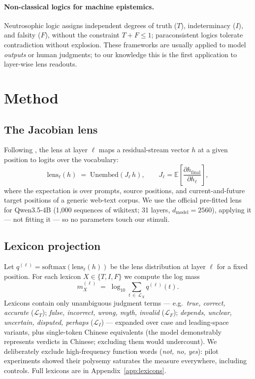 \documentclass[11pt]{article}
\begin{document}
\paragraph{Non-classical logics for machine epistemics.} Neutrosophic logic
\cite{smarandache1998neutrosophy} assigns independent degrees of truth ($T$),
indeterminacy ($I$), and falsity ($F$), without the constraint $T+F\le 1$;
paraconsistent logics \cite{priest1979paradox} tolerate contradiction without
explosion. These frameworks are usually applied to model \emph{outputs} or
human judgments; to our knowledge this is the first application to layer-wise
lens readouts.

\section{Method}\label{sec:method}

\subsection{The Jacobian lens}
Following \cite{anthropic2026workspace}, the lens at layer $\ell$ maps a
residual-stream vector $h$ at a given position to logits over the vocabulary:
\begin{equation}
\mathrm{lens}_\ell(h) \;=\; \mathrm{Unembed}\!\left(J_\ell\, h\right),
\qquad J_\ell = \mathbb{E}\!\left[\frac{\partial h_{\text{final}}}{\partial h_\ell}\right],
\end{equation}
where the expectation is over prompts, source positions, and current-and-future
target positions of a generic web-text corpus. We use the official pre-fitted
lens for Qwen3.5-4B (1{,}000 sequences of wikitext; 31 layers,
$d_{\text{model}} = 2560$), applying it --- not fitting it --- so no parameters
touch our stimuli.

\subsection{Lexicon projection}
Let $q^{(\ell)} = \mathrm{softmax}(\mathrm{lens}_\ell(h))$ be the lens
distribution at layer $\ell$ for a fixed position. For each lexicon
$X \in \{T, I, F\}$ we compute the log mass
\begin{equation}
m_X^{(\ell)} \;=\; \log_{10} \sum_{t \,\in\, \mathcal{L}_X} q^{(\ell)}(t).
\end{equation}
Lexicons contain only unambiguous judgment terms --- e.g.\ \emph{true, correct,
accurate} ($\mathcal{L}_T$); \emph{false, incorrect, wrong, myth, invalid}
($\mathcal{L}_F$); \emph{depends, unclear, uncertain, disputed, perhaps}
($\mathcal{L}_I$) --- expanded over case and leading-space variants, plus
single-token Chinese equivalents (the model demonstrably represents verdicts in
Chinese; excluding them would undercount). We deliberately exclude
high-frequency function words (\emph{not, no, yes}): pilot experiments showed
their polysemy saturates the measure everywhere, including controls. Full
lexicons are in Appendix~\ref{app:lexicons}.
\end{document}
